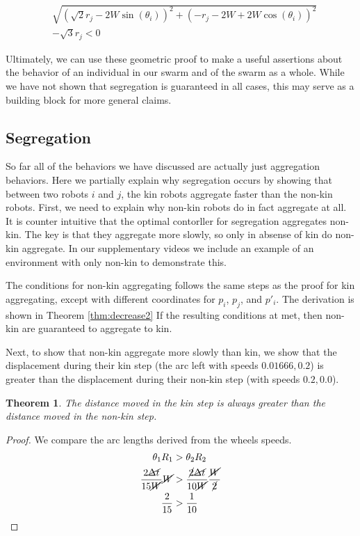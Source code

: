 \documentclass[conference]{IEEEtran}
\newtheorem{theorem}{Theorem}
\begin{document}
    \begin{equation} \label{eq:ring_agg_result}
      \begin{split}
        &\sqrt{(\sqrt{2}r_j - 2W\sin(\theta_i))^2 + (-r_j-2W+2W\cos(\theta_i))^2} \\
        &-\sqrt{3}r_j < 0
      \end{split}
    \end{equation}

    Ultimately, we can use these geometric proof to make a useful assertions about the behavior of an individual in our swarm and of the swarm as a whole. While we have not shown that segregation is guaranteed in all cases, this may serve as a building block for more general claims.

  \subsection{Segregation}

    So far all of the behaviors we have discussed are actually just aggregation behaviors. Here we partially explain why segregation occurs by showing that between two robots $i$ and $j$, the kin robots aggregate faster than the non-kin robots. First, we need to explain why non-kin robots do in fact aggregate at all. It is counter intuitive that the optimal contorller for segregation aggregates non-kin. The key is that they aggregate more slowly, so only in absense of kin do non-kin aggregate. In our supplementary videos we include an example of an environment with only non-kin to demonstrate this.

    The conditions for non-kin aggregating follows the same steps as the proof for kin aggregating, except with different coordinates for $p_i$, $p_j$, and $p'_i$. The derivation is shown in Theorem \ref{thm:decrease2} If the resulting conditions at met, then non-kin are guaranteed to aggregate to kin.

    Next, to show that non-kin aggregate more slowly than kin, we show that the displacement during their kin step (the arc left with speeds $0.01666, 0.2$) is greater than the displacement during their non-kin step (with speeds $0.2, 0.0$).

    \begin{theorem} \label{thm:seg}
      The distance moved in the kin step is always greater than the distance moved in the non-kin step.
    \end{theorem}
    \begin{proof}
      We compare the arc lengths derived from the wheels speeds.
      \begin{align*}
        \theta_1 R_1 &> \theta_2 R_2 \\
        \frac{2\cancel{\Delta t}}{15\cancel{W}} \cancel{W} &> \frac{\cancel{2}\cancel{\Delta t}}{10\cancel{W}} \frac{\cancel{W}}{\cancel{2}} \\
        \frac{2}{15} &> \frac{1}{10} \\
      \end{align*}
    \end{proof}
\end{document}
